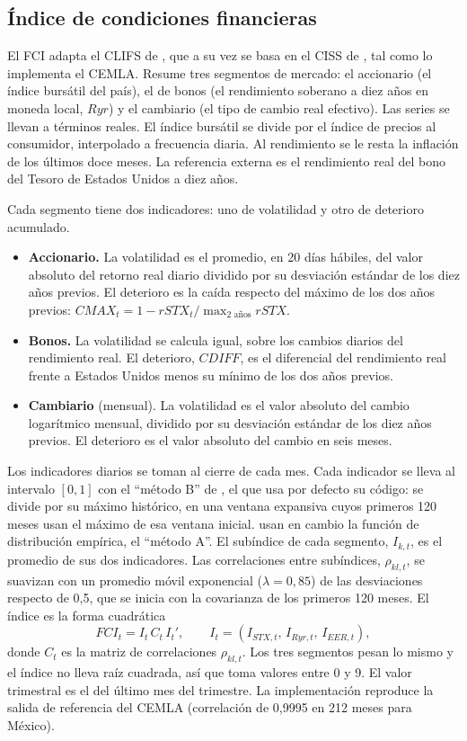 \subsection{Índice de condiciones financieras}

El FCI adapta el CLIFS de \citet{Duprey2017}, que a su vez se basa en el CISS de \citet{HolloKremerLoDuca2012}, tal como lo implementa el CEMLA. Resume tres segmentos de mercado: el accionario (el índice bursátil del país), el de bonos (el rendimiento soberano a diez años en moneda local, $Ryr$) y el cambiario (el tipo de cambio real efectivo). Las series se llevan a términos reales. El índice bursátil se divide por el índice de precios al consumidor, interpolado a frecuencia diaria. Al rendimiento se le resta la inflación de los últimos doce meses. La referencia externa es el rendimiento real del bono del Tesoro de Estados Unidos a diez años.

Cada segmento tiene dos indicadores: uno de volatilidad y otro de deterioro acumulado.
\begin{itemize}
    \item \textbf{Accionario.} La volatilidad es el promedio, en 20 días hábiles, del valor absoluto del retorno real diario dividido por su desviación estándar de los diez años previos. El deterioro es la caída respecto del máximo de los dos años previos: $CMAX_t=1-rSTX_t/\max_{2\text{ años}} rSTX$.
    \item \textbf{Bonos.} La volatilidad se calcula igual, sobre los cambios diarios del rendimiento real. El deterioro, $CDIFF$, es el diferencial del rendimiento real frente a Estados Unidos menos su mínimo de los dos años previos.
    \item \textbf{Cambiario} (mensual). La volatilidad es el valor absoluto del cambio logarítmico mensual, dividido por su desviación estándar de los diez años previos. El deterioro es el valor absoluto del cambio en seis meses.
\end{itemize}
Los indicadores diarios se toman al cierre de cada mes. Cada indicador se lleva al intervalo $[0,1]$ con el ``método B'' de \citet{OssandonBusch2022}, el que usa por defecto su código: se divide por su máximo histórico, en una ventana expansiva cuyos primeros 120 meses usan el máximo de esa ventana inicial. \citet{Duprey2017} usan en cambio la función de distribución empírica, el ``método A''. El subíndice de cada segmento, $I_{k,t}$, es el promedio de sus dos indicadores. Las correlaciones entre subíndices, $\rho_{kl,t}$, se suavizan con un promedio móvil exponencial ($\lambda=0{,}85$) de las desviaciones respecto de 0,5, que se inicia con la covarianza de los primeros 120 meses. El índice es la forma cuadrática
\[ FCI_t=I_t\,C_t\,I_t', \qquad I_t=(I_{STX,t},\,I_{Ryr,t},\,I_{EER,t}), \]
donde $C_t$ es la matriz de correlaciones $\rho_{kl,t}$. Los tres segmentos pesan lo mismo y el índice no lleva raíz cuadrada, así que toma valores entre 0 y 9. El valor trimestral es el del último mes del trimestre. La implementación reproduce la salida de referencia del CEMLA (correlación de 0,9995 en 212 meses para México).

